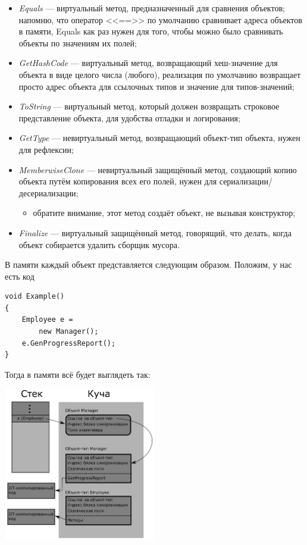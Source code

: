 \documentclass[a5paper]{article}
\begin{document}
\begin{itemize}
    \item \textit{Equals} --- виртуальный метод, предназначенный для сравнения объектов; напомню, что оператор <<==>> по умолчанию сравнивает адреса объектов в памяти, Equals как раз нужен для того, чтобы можно было сравнивать объекты по значениям их полей;
    \item \textit{GetHashCode} --- виртуальный метод, возвращающий хеш-значение для объекта в виде целого числа (любого), реализация по умолчанию возвращает просто адрес объекта для ссылочных типов и значение для типов-значений;
    \item \textit{ToString} --- виртуальный метод, который должен возвращать строковое представление объекта, для удобства отладки и логирования;
    \item \textit{GetType} --- невиртуальный метод, возвращающий объект-тип объекта, нужен для рефлексии;
    \item \textit{MemberwiseClone} --- невиртуальный защищённый метод, создающий копию объекта путём копирования всех его полей, нужен для сериализации/десериализации;
    \begin{itemize}
        \item обратите внимание, этот метод создаёт объект, не вызывая конструктор;
    \end{itemize}
    \item \textit{Finalize} --- виртуальный защищённый метод, говорящий, что делать, когда объект собирается удалить сборщик мусора.
\end{itemize}

В памяти каждый объект представляется следующим образом. Положим, у нас есть код

\begin{verbatim}
void Example() 
{
    Employee e = 
        new Manager();
    e.GenProgressReport();
}
\end{verbatim}

Тогда в памяти всё будет выглядеть так:

\begin{center}
    \includegraphics[width=0.5\textwidth]{objectInMemory.png}
\end{center}
\end{document}
